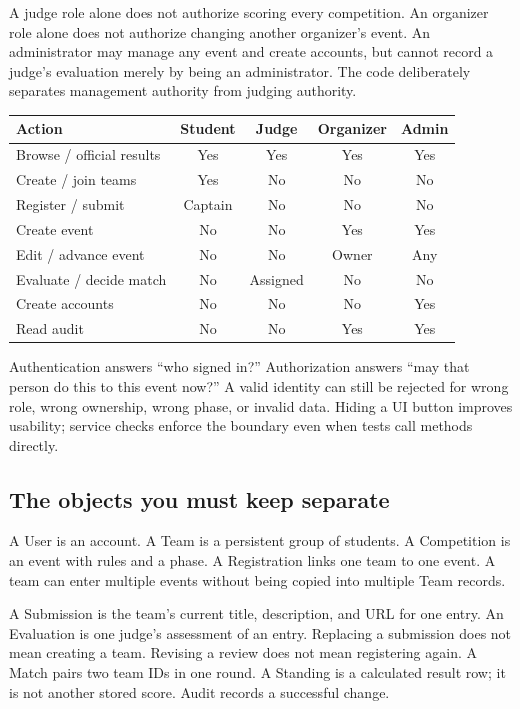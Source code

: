\documentclass[12pt]{article}
\begin{document}
A judge role alone does not authorize scoring every competition. An organizer role alone does not authorize changing another organizer's event. An administrator may manage any event and create accounts, but cannot record a judge's evaluation merely by being an administrator. The code deliberately separates management authority from judging authority.

\begin{tabularx}{\linewidth}{Ycccc}\toprule Action & Student & Judge & Organizer & Admin\\\midrule
Browse / official results & Yes & Yes & Yes & Yes\\
Create / join teams & Yes & No & No & No\\
Register / submit & Captain & No & No & No\\
Create event & No & No & Yes & Yes\\
Edit / advance event & No & No & Owner & Any\\
Evaluate / decide match & No & Assigned & No & No\\
Create accounts & No & No & No & Yes\\
Read audit & No & No & Yes & Yes\\\bottomrule\end{tabularx}

Authentication answers ``who signed in?'' Authorization answers ``may that person do this to this event now?'' A valid identity can still be rejected for wrong role, wrong ownership, wrong phase, or invalid data. Hiding a UI button improves usability; service checks enforce the boundary even when tests call methods directly.

\subsection{The objects you must keep separate}
A User is an account. A Team is a persistent group of students. A Competition is an event with rules and a phase. A Registration links one team to one event. A team can enter multiple events without being copied into multiple Team records.

A Submission is the team's current title, description, and URL for one entry. An Evaluation is one judge's assessment of an entry. Replacing a submission does not mean creating a team. Revising a review does not mean registering again. A Match pairs two team IDs in one round. A Standing is a calculated result row; it is not another stored score. Audit records a successful change.
\end{document}
